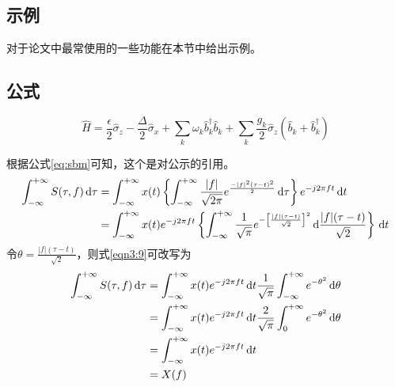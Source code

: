 \subsection{示例}
对于论文中最常使用的一些功能在本节中给出示例。
\subsection{公式}
\begin{equation}
    \hat{H}=\frac{\epsilon}{2}\hat{\sigma}_{z}-\frac{\Delta}{2}\hat{\sigma}_{x}+\sum_{k}\omega_{k}\hat{b}_{k}^{\dagger}\hat{b}_{k}+\sum_{k}\frac{g_{k}}{2}\hat{\sigma}_{z}(\hat{b}_{k}+\hat{b}_{k}^{\dagger})\label{eq:sbm}
\end{equation}

根据公式\ref{eq:sbm}可知，这个是对公示的引用。
\begin{align}\label{eqn3:9}
    \int_{-\infty}^{+\infty}S(\tau,f)\,\mathrm{d}\tau & =\int_{-\infty}^{+\infty}x(t)\left\{\int_{-\infty}^{+\infty}\frac{|f|}{\sqrt{2\pi}}e^{\frac{-|f|^2(\tau-t)^2}{2}}\,\mathrm{d}\tau\right\}e^{-j2\pi ft}\,\mathrm{d}t\notag                                  \\
                                                      & =\int_{-\infty}^{+\infty}x(t)e^{-j2\pi ft}\left\{\int_{-\infty}^{+\infty}\frac{1}{\sqrt{\pi}}e^{-\left[\frac{|f|(\tau-t)}{\sqrt{2}}\right]^2}\,\mathrm{d}\frac{|f|(\tau-t)}{\sqrt{2}}\right\}\,\mathrm{d}t
\end{align}
令$\theta=\frac{|f|(\tau-t)}{\sqrt{2}}$，则式\eqref{eqn3:9}可改写为
\begin{align}\label{eqn3:10}
    \int_{-\infty}^{+\infty}S(\tau,f)\,\mathrm{d}\tau & =\int_{-\infty}^{+\infty}x(t)e^{-j2\pi ft}\,\mathrm{d}t\frac{1}{\sqrt{\pi}}\int_{-\infty}^{+\infty}e^{-\theta^2}\,\mathrm{d}\theta\notag \\
                                                      & =\int_{-\infty}^{+\infty}x(t)e^{-j2\pi ft}\,\mathrm{d}t\frac{2}{\sqrt{\pi}}\int_{0}^{+\infty}e^{-\theta^2}\,\mathrm{d}\theta\notag       \\
                                                      & =\int_{-\infty}^{+\infty}x(t)e^{-j2\pi ft}\,\mathrm{d}t\notag                                                                            \\
                                                      & =X(f)
\end{align}
